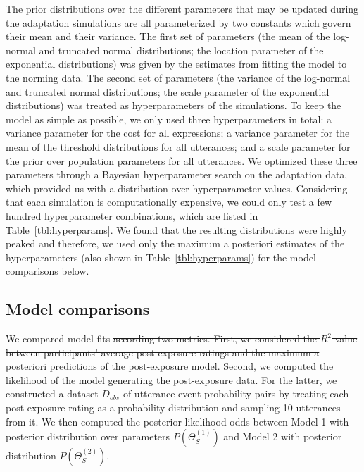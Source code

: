 \documentclass[man, floatsintext]{apa6}
\providecommand{\DIFadd}[1]{{\protect\color{blue}\uwave{#1}}} %
\providecommand{\DIFdel}[1]{{\protect\color{red}\sout{#1}}}                      %
\providecommand{\DIFaddbegin}{} %
\providecommand{\DIFaddend}{} %
\providecommand{\DIFdelbegin}{} %
\providecommand{\DIFdelend}{} %
\newcommand{\DIFscaledelfig}{0.5}
\newlength{\DIFdelgraphicswidth} %
\newlength{\DIFdelgraphicsheight} %
\newcommand{\DIFaddincludegraphics}[2][]{{\color{blue}\fbox{\DIFOincludegraphics[#1]{#2}}}} %
\newcommand{\DIFdelincludegraphics}[2][]{%
\sbox{\DIFdelgraphicsbox}{\DIFOincludegraphics[#1]{#2}}%
\settoboxwidth{\DIFdelgraphicswidth}{\DIFdelgraphicsbox} %
\settoboxtotalheight{\DIFdelgraphicsheight}{\DIFdelgraphicsbox} %
\scalebox{\DIFscaledelfig}{%
\parbox[b]{\DIFdelgraphicswidth}{\usebox{\DIFdelgraphicsbox}\\[-\baselineskip] \rule{\DIFdelgraphicswidth}{0em}}\llap{\resizebox{\DIFdelgraphicswidth}{\DIFdelgraphicsheight}{%
\setlength{\unitlength}{\DIFdelgraphicswidth}%
\begin{picture}(1,1)%
\thicklines\linethickness{2pt} %
{\color[rgb]{1,0,0}\put(0,0){\framebox(1,1){}}}%
{\color[rgb]{1,0,0}\put(0,0){\line( 1,1){1}}}%
{\color[rgb]{1,0,0}\put(0,1){\line(1,-1){1}}}%
\end{picture}%
}\hspace*{3pt}}} %
} %
\DeclareRobustCommand{\DIFaddbegin}{\DIFOaddbegin \let\includegraphics\DIFaddincludegraphics} %
\DeclareRobustCommand{\DIFaddend}{\DIFOaddend \let\includegraphics\DIFOincludegraphics} %
\DeclareRobustCommand{\DIFdelbegin}{\DIFOdelbegin \let\includegraphics\DIFdelincludegraphics} %
\DeclareRobustCommand{\DIFdelend}{\DIFOaddend \let\includegraphics\DIFOincludegraphics} %
\begin{document}
The prior distributions over the different parameters that may be updated during the adaptation simulations are all parameterized by two constants which govern their mean and their variance. The first set of parameters (the mean of the log-normal and truncated normal distributions; the location parameter of the exponential distributions) was given by the estimates from fitting the model to the norming data. The second set of parameters (the variance of the log-normal and truncated normal distributions; the scale parameter of the exponential distributions) was treated as hyperparameters of the simulations. To keep the model as simple as possible, we only used three hyperparameters in total: a variance parameter for the cost for all expressions; a variance parameter for the mean of the threshold distributions for all utterances; and a scale parameter for the prior over population parameters for all utterances. We optimized these three parameters through a Bayesian hyperparameter search on the adaptation data, which provided us with a distribution over hyperparameter values. Considering that each simulation is computationally expensive, we could only test a few hundred hyperparameter combinations, which are listed in Table~\ref{tbl:hyperparams}. We found that the resulting distributions were highly peaked and therefore, we used only the maximum a posteriori estimates of the hyperparameters (also shown in Table~\ref{tbl:hyperparams}) for the model comparisons below.


\subsection{Model comparisons}

We compared model fits \DIFdelbegin \DIFdel{according two metrics. First, we considered the $R^2$ value between participants' average post-exposure ratings and the maximum a posteriori predictions of the post-exposure model. Second, we computed the }\DIFdelend \DIFaddbegin \DIFadd{via the }\DIFaddend likelihood of the model generating the post-exposure data. \DIFdelbegin \DIFdel{For the latter}\DIFdelend \DIFaddbegin \DIFadd{To compute this metric}\DIFaddend , we constructed a dataset $D_{obs}$ of utterance-event probability pairs by treating each post-exposure rating as a probability distribution and sampling 10 utterances from it. We then computed the posterior likelihood odds between Model 1 with posterior distribution over parameters $P(\Theta_{S}^{(1)})$ and Model 2 with posterior distribution $P(\Theta_{S}^{(2)})$.
\end{document}
